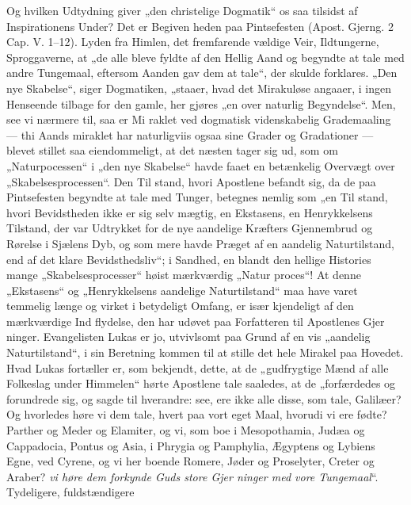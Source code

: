 \documentclass[12pt,a4paper]{article}
\newcommand{\opage}[1]{\marginnote{\footnotesize\textit{[#1]}}}
\begin{document}
Og hvilken Udtydning giver „den christelige Dogmatik“
os saa tilsidst af Inspirationens Under? Det er Begiven\-%
heden paa Pintsefesten (Apost. Gjerng. 2 Cap. V. 1--12).
Lyden fra Himlen, det fremfarende vældige Veir, Ildtungerne,
Sproggaverne, at „de alle bleve fyldte af den Hellig Aand
og begyndte at tale med andre Tungemaal, eftersom Aanden
gav dem at tale“, der skulde forklares. „Den nye Skabelse“,
siger Dogmatiken, „staaer, hvad det Mirakuløse angaaer, i
ingen Henseende tilbage for den gamle, her gjøres „en over\-%
naturlig Begyndelse“. Men, see vi nærmere til, saa er Mi\-%
raklet ved dogmatisk videnskabelig Grademaaling --- thi Aands\-%
miraklet har naturligviis ogsaa sine Grader og Gradationer
--- blevet stillet saa eiendommeligt, at det næsten tager sig ud,
som om „Naturpocessen“ i „den nye Skabelse“ havde faaet%
en betænkelig Overvægt over „Skabelsesprocessen“. Den Til\-%
stand, hvori Apostlene befandt sig, da de paa Pintsefesten
begyndte at tale med Tunger, betegnes nemlig som „en Til\-%
stand, hvori Bevidstheden ikke er sig selv mægtig, en Ekstasens,
en Henrykkelsens Tilstand, der var Udtrykket for de nye
aandelige Kræfters Gjennembrud og Rørelse i Sjælens Dyb,
og som mere havde Præget af en aandelig Naturtilstand, end
af det klare Bevidsthedsliv“; i Sandhed, en blandt den hellige
Histories mange „Skabelsesprocesser“ høist mærkværdig „Natur\-%
proces“! At denne „Ekstasens“ og „Henrykkelsens aandelige
Naturtilstand“ maa have varet temmelig længe og virket i
betydeligt Omfang, er især kjendeligt af den mærkværdige Ind\-%
flydelse, den har udøvet paa Forfatteren til Apostlenes Gjer\-%
ninger. Evangelisten Lukas er jo, utvivlsomt paa Grund af
en vis „aandelig Naturtilstand“, i sin Beretning kommen til
at stille det hele Mirakel paa Hovedet. Hvad Lukas fortæller
er, som bekjendt, dette, at de „gudfrygtige Mænd af alle
Folkeslag under Himmelen“ hørte Apostlene tale saaledes, at
de „forfærdedes og forundrede sig, og sagde til hverandre:
see, ere ikke alle disse, som tale, Galilæer? Og hvorledes
\opage{10}\setcounter{footnote}{0}%
høre vi dem tale, hvert paa vort eget Maal, hvorudi vi ere
fødte? Parther og Meder og Elamiter, og vi, som boe i
Mesopothamia, Judæa og Cappadocia, Pontus og Asia, i
Phrygia og Pamphylia, Ægyptens og Lybiens Egne, ved
Cyrene, og vi her boende Romere, Jøder og Proselyter, Creter
og Araber? \emph{vi høre dem forkynde Guds store Gjer\-%
ninger med vore Tungemaal}“. Tydeligere, fuldstændigere
\end{document}
